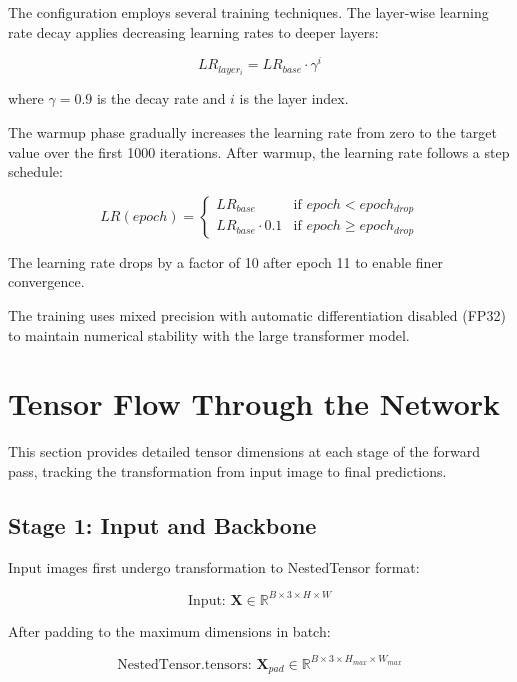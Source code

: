 \documentclass[12pt,a4paper]{article}
\newcommand{\B}[1]{\mathbf{#1}}
\begin{document}
The configuration employs several training techniques. The layer-wise learning rate decay applies decreasing learning rates to deeper layers:

\begin{equation}
LR_{layer_i} = LR_{base} \cdot \gamma^{i}
\end{equation}

where $\gamma = 0.9$ is the decay rate and $i$ is the layer index.

The warmup phase gradually increases the learning rate from zero to the target value over the first 1000 iterations. After warmup, the learning rate follows a step schedule:

\begin{equation}
LR(epoch) = 
\begin{cases}
LR_{base} & \text{if } epoch < epoch_{drop} \\
LR_{base} \cdot 0.1 & \text{if } epoch \geq epoch_{drop}
\end{cases}
\end{equation}

The learning rate drops by a factor of 10 after epoch 11 to enable finer convergence.

The training uses mixed precision with automatic differentiation disabled (FP32) to maintain numerical stability with the large transformer model.

\section{Tensor Flow Through the Network}

This section provides detailed tensor dimensions at each stage of the forward pass, tracking the transformation from input image to final predictions.

\subsection{Stage 1: Input and Backbone}

Input images first undergo transformation to NestedTensor format:

\begin{equation}
\text{Input: } \B{X} \in \mathbb{R}^{B \times 3 \times H \times W}
\end{equation}

After padding to the maximum dimensions in batch:

\begin{equation}
\text{NestedTensor.tensors: } \B{X}_{pad} \in \mathbb{R}^{B \times 3 \times H_{max} \times W_{max}}
\end{equation}
\end{document}
